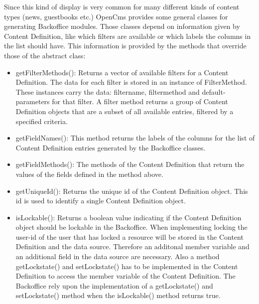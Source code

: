 Since this kind of display is very common for many different kinds of
content types (news, guestbooks etc.) OpenCms provides some general
classes for generating Backoffice modules. Those classes depend on
information given by Content Definition, like which filters are available
or which labels the columns in the list should have. This information is
provided by the methods that override those of the abstract class:

\begin{itemize}
\item {\meth getFilterMethods()}: Returns a vector of available filters for
a Content Definition. The data for each filter is stored in an
instance of FilterMethod. These instances carry the data: filtername,
filtermethod and default-parameters for that filter. A filter method
returns a group of Content Definition objects that are a subset of all
available entries, filtered by a specified criteria.

\item {\name getFieldNames()}: This method returns the labels of the columns 
for the list of Content Definition entries generated by the Backoffice classes.

\item {\meth getFieldMethods()}: The methods of the Content Definition that
return the values of the fields defined in the method above.

\item {\name getUniqueId()}: Returns the unique id of the Content Definition
object. This id is used to identify a single Content Definition object.

\item {\name isLockable()}: Returns a boolean value indicating if the Content Definition
object should be lockable in the Backoffice. When implementing locking the user-id of the 
user that has locked a resource will be stored in the Content Definition and the data source.
Therefore an additonal member variable and an additional field in the data source are necessary.
Also a method  {\meth getLockstate()} and {\meth setLockstate()} has to be implemented in the 
Content Definition to access the member variable of the Content Definition.
The Backoffice rely upon the implementation of a {\meth getLockstate()} 
and {\meth setLockstate()} method when the {\meth isLockable()} 
method returns true.

\end{itemize}

